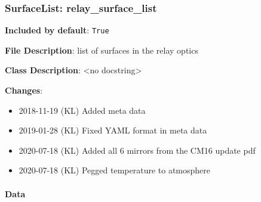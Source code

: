 \subsubsection{SurfaceList: \textquotedbl{}relay\_surface\_list\textquotedbl{}%
  \label{surfacelist-relay-surface-list}%
}

\textbf{Included by default}: \texttt{True}

\textbf{File Description}: list of surfaces in the relay optics

\textbf{Class Description}: <no docstring>

\textbf{Changes}:

\begin{itemize}
\item 2018-11-19 (KL) Added meta data

\item 2019-01-28 (KL) Fixed YAML format in meta data

\item 2020-07-18 (KL) Added all 6 mirrors from the CM16 update pdf

\item 2020-07-18 (KL) Pegged temperature to atmosphere
\end{itemize}


\paragraph{Data%
  \label{id1}%
}

\begin{figure}[H]
\noindent{}\label{fig-relay-surface-list}
\end{figure}

